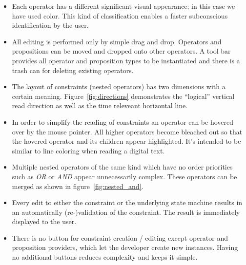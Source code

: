 \documentclass[conference]{IEEEtran}
\begin{document}
\begin{itemize}
	\item Each operator has a different significant visual appearance; in this case we have used color. This kind of classification enables a faster subconscious identification by the user.
	\item All editing is performed only by simple drag and drop. Operators and propositions can be moved and dropped onto other operators. A tool bar provides all operator and proposition types to be instantiated and there is a trash can for deleting existing operators.
	\item The layout of constraints (nested operators) has two dimensions with a certain meaning. Figure~\ref{fig:directions} demonstrates the ``logical'' vertical read direction as well as the time releveant horizontal line.
	\item In order to simplify the reading of constraints an operator can be hovered over by the mouse pointer. All higher operators become bleached out so that the hovered operator and its children appear highlighted. It's intended to be similar to line coloring when reading a digital text.
	\item Multiple nested operators of the same kind which have no order priorities such as \emph{OR} or \emph{AND} appear unnecessarily complex. These operators can be merged as shown in figure~\ref{fig:nested_and}.
	\item Every edit to either the constraint or the underlying state machine results in an automatically (re-)validation of the constraint. The result is immediately displayed to the user.
	\item There is no button for constraint creation / editing except operator and proposition providers, which let the developer create new instances. Having no additional buttons reduces complexity and keeps it simple.
\end{itemize}
\end{document}
